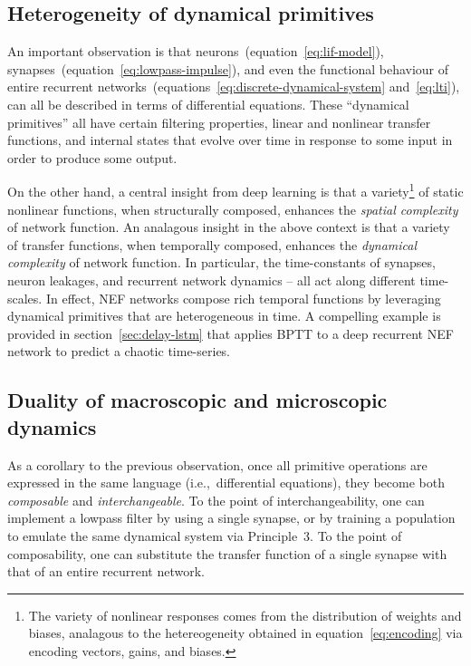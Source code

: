 \subsection{Heterogeneity of dynamical primitives}

An important observation is that neurons~(equation~\ref{eq:lif-model}), synapses~(equation~\ref{eq:lowpass-impulse}), and even the functional behaviour of entire recurrent networks~(equations~\ref{eq:discrete-dynamical-system} and~\ref{eq:lti}), can all be described in terms of differential equations.
These ``dynamical primitives'' all have certain filtering properties, linear and nonlinear transfer functions, and internal states that evolve over time in response to some input in order to produce some output.

On the other hand, a central insight from deep learning is that a variety\footnote{%
The variety of nonlinear responses comes from the distribution of weights and biases, analagous to the hetereogeneity obtained in equation~\ref{eq:encoding} via encoding vectors, gains, and biases.}
of static nonlinear functions, when structurally composed, enhances the \emph{spatial complexity} of network function.
An analagous insight in the above context is that a variety of transfer functions, when temporally composed, enhances the \emph{dynamical complexity} of network function.
In particular, the time-constants of synapses, neuron leakages, and recurrent network dynamics -- all act along different time-scales.
In effect, NEF networks compose rich temporal functions by leveraging dynamical primitives that are heterogeneous in time.
A compelling example is provided in section~\ref{sec:delay-lstm} that applies BPTT to a deep recurrent NEF network to predict a chaotic time-series.

\subsection{Duality of macroscopic and microscopic dynamics}

As a corollary to the previous observation,
once all primitive operations are expressed in the same language (i.e.,~differential equations), they become both \emph{composable} and \emph{interchangeable}.
To the point of interchangeability, one can implement a lowpass filter by using a single synapse, or by training a population to emulate the same dynamical system via Principle~3.
To the point of composability, one can substitute the transfer function of a single synapse with that of an entire recurrent network.

